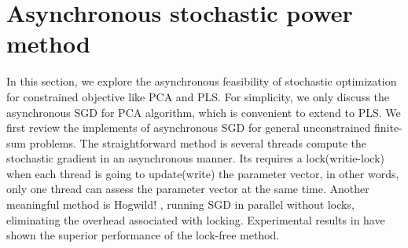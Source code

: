 \documentclass[conference]{IEEEtran}
\begin{document}
 


\section{Asynchronous stochastic power method}
\label{ASGD}
In this section, we explore the asynchronous feasibility of stochastic optimization for constrained objective like PCA and PLS. For simplicity, we only discuss the asynchronous SGD for PCA algorithm, which is convenient to extend to PLS.
We first review the implements of asynchronous SGD for general unconstrained finite-sum problems. 
The straightforward method is several threads compute the stochastic gradient in an asynchronous manner. Its requires a lock(writie-lock) when each thread is going to update(write) the parameter vector, in other words, only one thread can assess the parameter vector at the same time. Another meaningful method is Hogwild! \citep{Feng2011HOGWILD}, running SGD in parallel without locks, eliminating the overhead associated with locking. Experimental results in \citep{Feng2011HOGWILD} have shown the superior performance of the lock-free method. 
\end{document}
